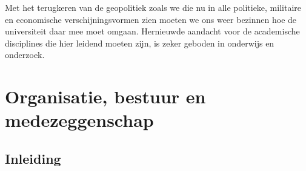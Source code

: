 \documentclass[empirical, authordate, ]{new-jote-article}
\begin{document}
	Met het terugkeren van de geopolitiek zoals we die nu in alle politieke, militaire en economische verschijningsvormen zien moeten we ons weer bezinnen hoe de universiteit daar mee moet omgaan. Hernieuwde aandacht voor de academische disciplines die hier leidend moeten zijn, is zeker geboden in onderwijs en onderzoek.







	\chapter{Organisatie, bestuur en medezeggenschap}



















	\section{Inleiding}
\end{document}
